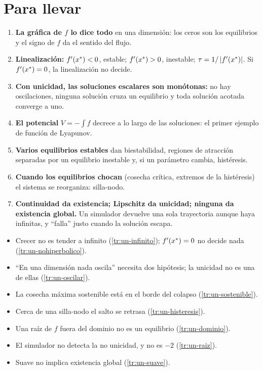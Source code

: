 \section{Para llevar}
\label{sec:un-cierre}

\begin{parallevar}
\begin{enumerate}
  \item \textbf{La gráfica de $f$ lo dice todo} en una dimensión: los ceros son los equilibrios y el signo de $f$ da el sentido del flujo.
  \item \textbf{Linealización:} $f'(x^{*})<0$, estable; $f'(x^{*})>0$, inestable; $\tau=1/\left\lvert f'(x^{*})\right\rvert$. Si $f'(x^{*})=0$, la linealización no decide.
  \item \textbf{Con unicidad, las soluciones escalares son monótonas:} no hay oscilaciones, ninguna solución cruza un equilibrio y toda solución acotada converge a uno.
  \item \textbf{El potencial} $V=-\int f$ decrece a lo largo de las soluciones: el primer ejemplo de función de Lyapunov.
  \item \textbf{Varios equilibrios estables} dan biestabilidad, regiones de atracción separadas por un equilibrio inestable y, si un parámetro cambia, histéresis.
  \item \textbf{Cuando los equilibrios chocan} (cosecha crítica, extremos de la histéresis) el sistema se reorganiza: silla-nodo.
  \item \textbf{Continuidad da existencia; Lipschitz da unicidad; ninguna da existencia global.} Un simulador devuelve una sola trayectoria aunque haya infinitas, y ``falla'' justo cuando la solución escapa.
\end{enumerate}
\end{parallevar}

\begin{trampa}[title={\faBug\hspace{0.45em}Las trampas del capítulo, en una caja}]{}
\begin{itemize}
  \item Crecer no es tender a infinito (\cref{tr:un-infinito}); $f'(x^{*})=0$ no decide nada (\cref{tr:un-nohiperbolico}).
  \item ``En una dimensión nada oscila'' necesita dos hipótesis; la unicidad no es una de ellas (\cref{tr:un-oscilar}).
  \item La cosecha máxima sostenible está en el borde del colapso (\cref{tr:un-sostenible}).
  \item Cerca de una silla-nodo el salto se retrasa (\cref{tr:un-histeresis}).
  \item Una raíz de $f$ fuera del dominio no es un equilibrio (\cref{tr:un-dominio}).
  \item El simulador no detecta la no unicidad, y  no es $-2$ (\cref{tr:un-raiz}).
  \item Suave no implica existencia global (\cref{tr:un-suave}).
\end{itemize}
\end{trampa}



